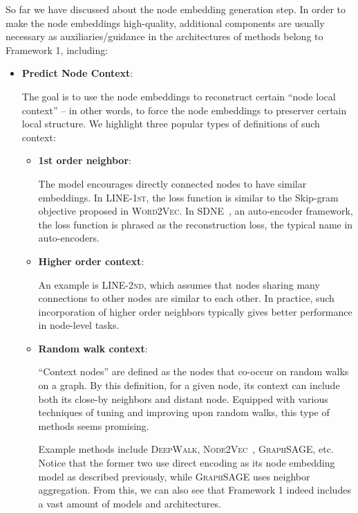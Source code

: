 \documentclass{article}
\newcommand{\sdne}{\textsc{SDNE}\xspace}
\newcommand{\graphsage}{\textsc{GraphSAGE}\xspace}
\newcommand{\wv}{\textsc{Word2Vec}\xspace}
\begin{document}
So far we have discussed about the node embedding generation step. In order to make the node embeddings high-quality, additional components are usually necessary as auxiliaries/guidance in the architectures of methods belong to Framework 1, including:
\begin{itemize}
    \item \textbf{{Predict Node Context}}:
    
    The goal is to use the node embeddings to reconstruct certain ``node local context'' -- in other words, to force the node embeddings to preserver certain local structure. We highlight three popular types of definitions of such context:
    \begin{itemize}
        \item \textbf{{1st order neighbor}}: 
        
        The model encourages directly connected nodes to have similar embeddings. In \textsc{LINE-1st}, the loss function is similar to the Skip-gram objective proposed in \wv. In \sdne~\cite{wang2016structural}, an auto-encoder framework, the loss function is phrased as the reconstruction loss, the typical name in auto-encoders. 
         
        \item \textbf{{Higher order context}}: 
        
        An example is \textsc{LINE-2nd}, which assumes that nodes sharing many connections to other nodes are similar to each other. In practice, such incorporation of higher order neighbors typically gives better performance in node-level tasks.
        
        \item \textbf{{Random walk context}}: 
        
        ``Context nodes'' are defined as the nodes that co-occur on random walks on a graph. By this definition, for a given node, its context can include both its close-by neighbors and distant node. 
        Equipped with various techniques of tuning and improving upon random walks, this type of methods seems promising.
        
        Example methods include \textsc{DeepWalk}, \textsc{Node2Vec}~\cite{grover2016node2vec}, \graphsage, etc. Notice that the former two use direct encoding as its node embedding model as described previously, while \graphsage uses neighbor aggregation. From this, we can also see that Framework 1 indeed includes a vast amount of models and architectures.
    \end{itemize}
    

\end{itemize}
\end{document}
